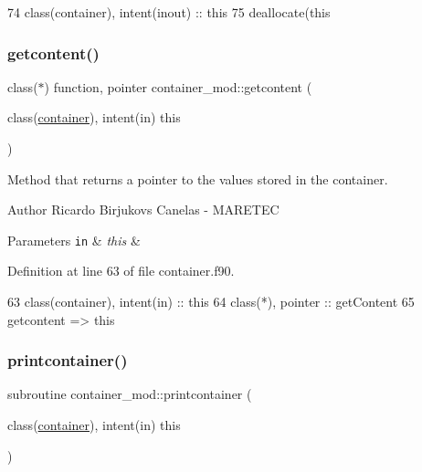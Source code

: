 \begin{DoxyCode}
74     \textcolor{keywordtype}{class}(container), \textcolor{keywordtype}{intent(inout)} :: this    
75     \textcolor{keyword}{deallocate}(this%
\end{DoxyCode}
\mbox{\label{namespacecontainer__mod_a23a016e747d896622127c0c21dca9836}} 
\subsubsection{\texorpdfstring{getcontent()}{getcontent()}}
{\footnotesize\ttfamily class($\ast$) function, pointer container\+\_\+mod\+::getcontent (\begin{DoxyParamCaption}\item[{class(\mbox{\hyperlink{structcontainer__mod_1_1container}{container}}), intent(in)}]{this }\end{DoxyParamCaption})\hspace{0.3cm}{\ttfamily [private]}}



Method that returns a pointer to the values stored in the container. 

\begin{DoxyAuthor}{Author}
Ricardo Birjukovs Canelas -\/ M\+A\+R\+E\+T\+EC 
\end{DoxyAuthor}

\begin{DoxyParams}[1]{Parameters}
\mbox{\tt in}  & {\em this} & \\
\hline
\end{DoxyParams}


Definition at line 63 of file container.\+f90.


\begin{DoxyCode}
63     \textcolor{keywordtype}{class}(container), \textcolor{keywordtype}{intent(in)} :: this
64     \textcolor{keywordtype}{class}(*), \textcolor{keywordtype}{pointer} :: getContent
65     getcontent => this%
\end{DoxyCode}
\mbox{\label{namespacecontainer__mod_abf1785185971a527e437d3a489462724}} 
\subsubsection{\texorpdfstring{printcontainer()}{printcontainer()}}
{\footnotesize\ttfamily subroutine container\+\_\+mod\+::printcontainer (\begin{DoxyParamCaption}\item[{class(\mbox{\hyperlink{structcontainer__mod_1_1container}{container}}), intent(in)}]{this }\end{DoxyParamCaption})\hspace{0.3cm}{\ttfamily [private]}}



